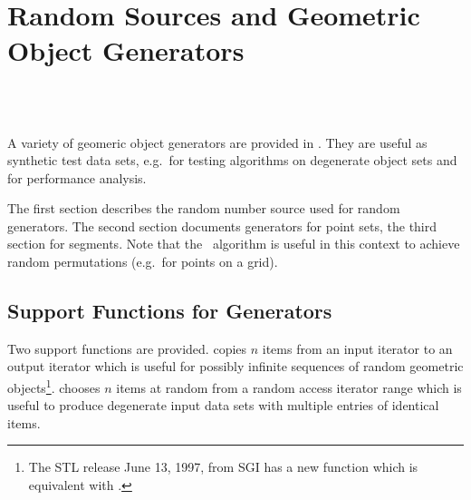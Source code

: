 
\beforecprogskip\medskipamount
\aftercprogskip\medskipamount
\ccParDims

\chapter{Random Sources and Geometric Object Generators}
\label{chapterGenerators}
\\
\\


A variety of geomeric object generators are provided in \cgal. They
are useful as synthetic test data sets, e.g.~for testing algorithms on
degenerate object sets and for performance analysis.

The first section describes the random number source used for random
generators. The second section documents generators for point sets,
the third section for segments. Note that the \stl\ algorithm
 is useful in this context to achieve random
permutations (e.g.~for points on a grid).




\newpage
\section{Support Functions for Generators}

Two support functions are provided.  copies $n$
items from an input iterator to an output iterator which is useful for
possibly infinite sequences of random geometric objects\footnote{%
The STL release June 13, 1997, from SGI has a new function  which is equivalent with .}.
 chooses $n$ items at random from a random
access iterator range which is useful to produce degenerate input data
sets with multiple entries of identical items.


